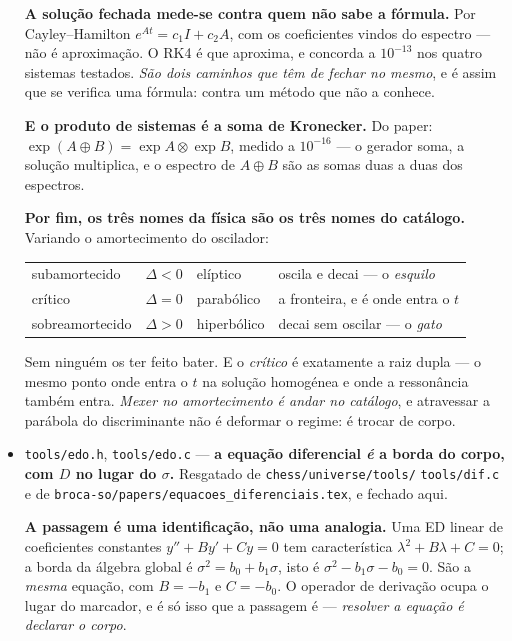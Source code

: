 \documentclass[11pt]{article}
\newcommand{\code}[1]{\texttt{\small #1}}
\theoremstyle{plain}
\theoremstyle{remark}
\begin{document}
\begin{itemize}
\textbf{A solução fechada mede-se contra quem não sabe a fórmula.} Por Cayley--Hamilton
$e^{At}=c_1I+c_2A$, com os coeficientes vindos do espectro --- não é aproximação. O RK4 é que
aproxima, e concorda a $10^{-13}$ nos quatro sistemas testados. \emph{São dois caminhos que têm de
fechar no mesmo}, e é assim que se verifica uma fórmula: contra um método que não a conhece.

\textbf{E o produto de sistemas é a soma de Kronecker.} Do paper: $\exp(A\oplus B)=\exp A\otimes
\exp B$, medido a $10^{-16}$ --- o gerador soma, a solução multiplica, e o espectro de $A\oplus B$
são as somas duas a duas dos espectros.

\textbf{Por fim, os três nomes da física são os três nomes do catálogo.} Variando o amortecimento
do oscilador:
\begin{center}
\begin{tabular}{llll}
subamortecido & $\Delta<0$ & elíptico & oscila e decai --- o \emph{esquilo} \\
crítico & $\Delta=0$ & parabólico & a fronteira, e é onde entra o $t$ \\
sobreamortecido & $\Delta>0$ & hiperbólico & decai sem oscilar --- o \emph{gato} \\
\end{tabular}
\end{center}
Sem ninguém os ter feito bater. E o \emph{crítico} é exatamente a raiz dupla --- o mesmo ponto
onde entra o $t$ na solução homogénea e onde a ressonância também entra. \emph{Mexer no
amortecimento é andar no catálogo}, e atravessar a parábola do discriminante não é deformar o
regime: é trocar de corpo.

\item \code{tools/edo.h}, \code{tools/edo.c} --- \textbf{a equação diferencial \emph{é} a
borda do corpo, com $D$ no lugar do $\sigma$.} Resgatado de \code{chess/universe/tools/}
\code{tools/dif.c} e de \code{broca-so/papers/equacoes\_diferenciais.tex}, e fechado aqui.

\textbf{A passagem é uma identificação, não uma analogia.} Uma ED linear de coeficientes
constantes $y''+By'+Cy=0$ tem característica $\lambda^2+B\lambda+C=0$; a borda da álgebra global é
$\sigma^2=b_0+b_1\sigma$, isto é $\sigma^2-b_1\sigma-b_0=0$. São a \emph{mesma} equação, com
$B=-b_1$ e $C=-b_0$. O operador de derivação ocupa o lugar do marcador, e é só isso que a passagem
é --- \emph{resolver a equação é declarar o corpo}.


\end{itemize}
\end{document}
